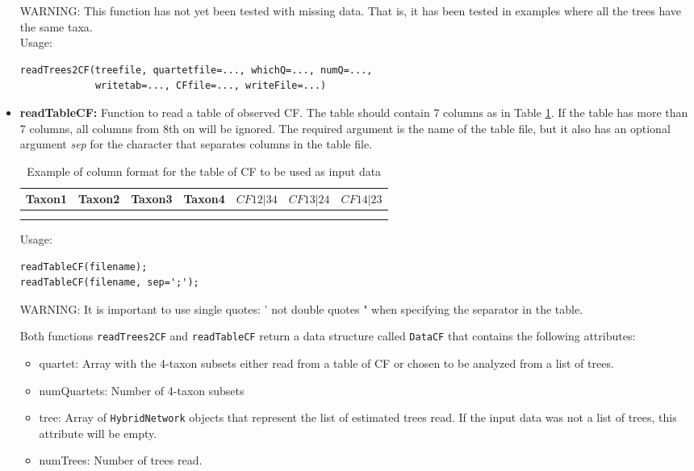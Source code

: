 \documentclass[12pt]{article}
\begin{document}
\begin{itemize}
  WARNING: This function has not yet been tested with missing
  data. That is, it has been tested in
  examples where all the trees have the same taxa.\\
  Usage:
\begin{lstlisting}
readTrees2CF(treefile, quartetfile=..., whichQ=..., numQ=...,
             writetab=..., CFfile=..., writeFile=...)
\end{lstlisting}

\item \textbf{readTableCF:} Function to read a table of observed
  CF. The table should contain 7 columns as in Table \ref{tableCF}. If
  the table has more than 7 columns, all columns from 8th on will be
  ignored. The required argument is the name of the table file, but it
  also has an optional argument \textit{sep} for the character that
  separates columns in the table file.\\
\begin{table}[h]
\centering
\begin{tabular}{c|c|c|c|c|c|c}
Taxon1 & Taxon2 &Taxon3 & Taxon4 & $CF12|34$ & $CF13|24$ &  $CF14|23$\\
\hline \\
 & & & & & &
\end{tabular}
\caption{Example of column format for the table of CF to be used as
  input data}
\label{tableCF}
\end{table}

Usage:
\begin{lstlisting}
readTableCF(filename);
readTableCF(filename, sep=';');
\end{lstlisting}
WARNING: It is important to use single quotes: ' not double quotes "
when specifying the separator in the table.

Both functions \texttt{readTrees2CF} and \texttt{readTableCF} return a
data structure called \texttt{DataCF} that contains the following
attributes:
\begin{itemize}
\item{quartet: Array with the 4-taxon subsets either read from a table of CF
    or chosen to be analyzed from a list of trees.}
\item{numQuartets: Number of 4-taxon subsets}
\item{tree: Array of \texttt{HybridNetwork} objects that represent the
  list of estimated trees read. If the input data was not a list of
  trees, this attribute will be empty.}
\item{numTrees: Number of trees read.}
\end{itemize}



\end{itemize}
\end{document}
